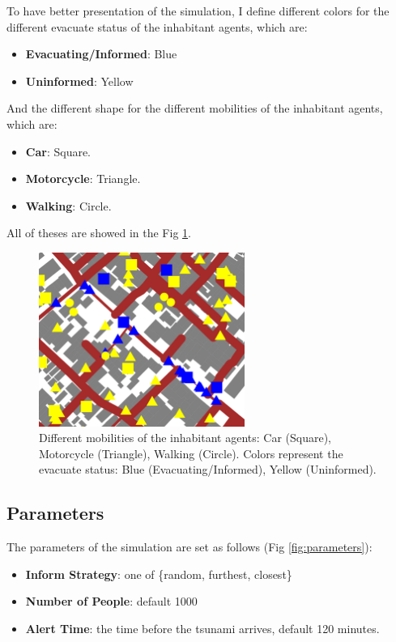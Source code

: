 \documentclass[12pt]{article}
\begin{document}
To have better presentation of the simulation, I define different colors for the different evacuate status of the inhabitant agents, which are:
\begin{itemize}
    \item \textbf{Evacuating/Informed}: Blue
    \item \textbf{Uninformed}: Yellow
\end{itemize}

And the different shape for the different mobilities of the inhabitant agents, which are:
\begin{itemize}
    \item \textbf{Car}: Square.
    \item \textbf{Motorcycle}: Triangle.
    \item \textbf{Walking}: Circle.
\end{itemize}

All of theses are showed in the Fig \ref{fig:mobilities}.

\begin{figure}
    \centering
    \includegraphics[width=0.6\textwidth]{../images/mobilities.png}
    \caption{Different mobilities of the inhabitant agents: Car (Square), Motorcycle (Triangle), Walking (Circle). Colors represent the evacuate status: Blue (Evacuating/Informed), Yellow (Uninformed).}
    \label{fig:mobilities}
\end{figure}

\subsection{Parameters}

The parameters of the simulation are set as follows (Fig \ref{fig:parameters}):
\begin{itemize}
    \item \textbf{Inform Strategy}: one of \{random, furthest, closest\}
    \item \textbf{Number of People}: default 1000
    \item \textbf{Alert Time}: the time before the tsunami arrives, default 120 minutes.
\end{itemize}
\end{document}
